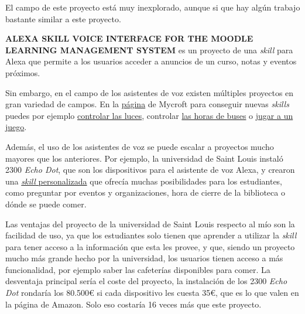 
El campo de este proyecto está muy inexplorado, aunque si que hay algún trabajo bastante similar a este proyecto.

\textbf{ALEXA SKILL VOICE INTERFACE FOR THE MOODLE LEARNING MANAGEMENT SYSTEM}\cite{meltonALEXASKILLVOICE} es un proyecto de una \textit{skill} para Alexa que permite a los usuarios acceder a anuncios de un curso, notas y eventos próximos.

Sin embargo, en el campo de los asistentes de voz existen múltiples proyectos en gran variedad de campos. En la \href{https://market.mycroft.ai/skills}{página} de Mycroft para conseguir nuevas \textit{skills} puedes por ejemplo \href{https://market.mycroft.ai/skills/3422768c-8f3a-45c4-ad47-a86b9eba6a02}{controlar las luces}, controlar \href{https://market.mycroft.ai/skills/b213f51b-c8aa-455e-80ec-f2489cf20eca}{las horas de buses} o \href{https://market.mycroft.ai/skills/5cff8320-4738-4e06-ac87-a5c3e6af5c25}{jugar a un juego}.

Además, el uso de los asistentes de voz se puede escalar a proyectos mucho mayores que los anteriores. Por ejemplo, la universidad de Saint Louis instaló 2300 \textit{Echo Dot}\cite{SLUAlexaProject}, que son los dispositivos para el asistente de voz Alexa, y crearon una \href{https://www.amazon.com/Saint-Louis-University-Ask/dp/B07YDNW9RN}{\textit{skill} personalizada} que ofrecía muchas posibilidades para los estudiantes, como preguntar por eventos y organizaciones, hora de cierre de la biblioteca o dónde se puede comer.

Las ventajas del proyecto de la universidad de Saint Louis respecto al mío son la facilidad de uso, ya que los estudiantes solo tienen que aprender a utilizar la \textit{skill} para tener acceso a la información que esta les provee, y que, siendo un proyecto mucho más grande hecho por la universidad, los usuarios tienen acceso a más funcionalidad, por ejemplo saber las cafeterías disponibles para comer. La desventaja principal sería el coste del proyecto, la instalación de los 2300 \textit{Echo Dot} rondaría los 80.500€ si cada dispositivo les cuesta 35€, que es lo que valen en la página de Amazon. Solo eso costaría 16 veces más que este proyecto.
